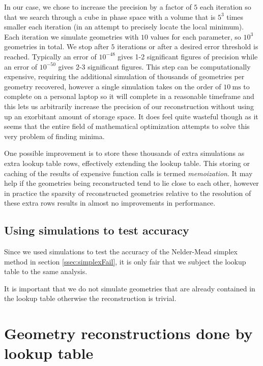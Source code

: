 In our case, we chose to increase the precision by a factor of $5$ each iteration so that we search through a cube in phase space with a volume that is $5^3$ times smaller each iteration (in an attempt to precisely locate the local minimum). Each iteration we simulate geometries with $10$ values for each parameter, so $10^3$ geometries in total. We stop after $5$ iterations or after a desired error threshold is reached. Typically an error of $10^{-48}$ gives 1-2 significant figures of precision while an error of $10^{-50}$ gives 2-3 significant figures. This step can be computationally expensive, requiring the additional simulation of thousands of geometries per geometry recovered, however a single simulation takes on the order of $\SI{10}{\ms}$ to complete on a personal laptop so it will complete in a reasonable timeframe and this lets us arbitrarily increase the precision of our reconstruction without using up an exorbitant amount of storage space. It does feel quite wasteful though as it seems that the entire field of mathematical optimization attempts to solve this very problem of finding minima.

One possible improvement is to store these thousands of extra simulations as extra lookup table rows, effectively extending the lookup table. This storing or caching of the results of expensive function calls is termed \emph{memoization}. It may help if the geometries being reconstructed tend to lie close to each other, however in practice the sparsity of reconstructed geometries relative to the resolution of these extra rows results in almost no improvements in performance.

\subsection{Using simulations to test accuracy} \label{ssec:LTaccuracy}
Since we used simulations to test the accuracy of the Nelder-Mead simplex method in section \ref{ssec:simplexFail}, it is only fair that we subject the lookup table to the same analysis.


It is important that we do not simulate geometries that are already contained in the lookup table otherwise the reconstruction is trivial.

\section{Geometry reconstructions done by lookup table} \label{sec:LTgeometries}


